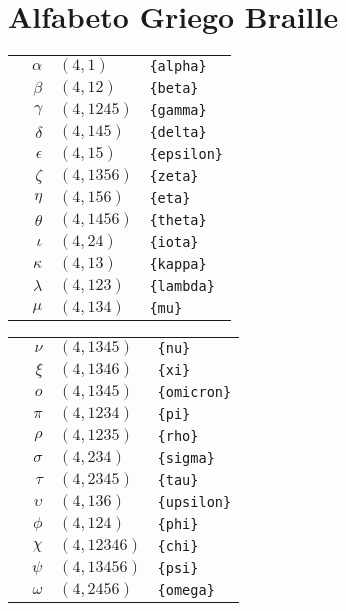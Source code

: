 \documentclass[draft]{article}
\newcommand{\myagtable}[1]{%
	\enskip\begin{tabular}[t]{l|r|l|l} 
		\hline #1 \hline
	\end{tabular}\enskip}
\begin{document}
\section{Alfabeto Griego Braille}

\begin{center}
	\myagtable{
		\braille{{alpha}}    & $\alpha$   & $(4,1)$     & \texttt{\{alpha\}}   \\
		\braille{{beta}}     & $\beta$    & $(4,12)$    & \texttt{\{beta\}}    \\
		\braille{{gamma}}    & $\gamma$   & $(4,1245)$  & \texttt{\{gamma\}}   \\
		\braille{{delta}}    & $\delta$   & $(4,145)$   & \texttt{\{delta\}}   \\
		\braille{{epsilon}}  & $\epsilon$ & $(4,15)$    & \texttt{\{epsilon\}} \\
		\braille{{zeta}}     & $\zeta$    & $(4,1356)$  & \texttt{\{zeta\}}    \\
		\braille{{eta}}      & $\eta$     & $(4,156)$   & \texttt{\{eta\}}     \\   
		\braille{{theta}}    & $\theta$   & $(4,1456)$  & \texttt{\{theta\}}   \\
		\braille{{iota}}     & $\iota$    & $(4,24)$    & \texttt{\{iota\}}    \\ 
		\braille{{kappa}}    & $\kappa$   & $(4,13)$    & \texttt{\{kappa\}}   \\
		\braille{{lambda}}   & $\lambda$  & $(4,123)$   & \texttt{\{lambda\}}  \\
		\braille{{mu}}       & $\mu$      & $(4,134)$   & \texttt{\{mu\}}      \\	
	}
	\myagtable{
		\braille{{nu}}       & $\nu$      & $(4,1345)$  & \texttt{\{nu\}}      \\
		\braille{{xi}}       & $\xi$      & $(4,1346)$  & \texttt{\{xi\}}      \\
		\braille{{omicron}}  & $o$        & $(4,1345)$  & \texttt{\{omicron\}} \\
		\braille{{pi}}       & $\pi$      & $(4,1234)$  & \texttt{\{pi\}}      \\
		\braille{{rho}}      & $\rho$     & $(4,1235)$  & \texttt{\{rho\}}     \\
		\braille{{sigma}}    & $\sigma$   & $(4,234)$   & \texttt{\{sigma\}}   \\
		\braille{{tau}}      & $\tau$     & $(4,2345)$  & \texttt{\{tau\}}     \\
		\braille{{upsilon}}  & $\upsilon$ & $(4,136)$   & \texttt{\{upsilon\}} \\
		\braille{{phi}}      & $\phi$     & $(4,124)$   & \texttt{\{phi\}}     \\
		\braille{{chi}}      & $\chi$     & $(4,12346)$ & \texttt{\{chi\}}     \\
		\braille{{psi}}      & $\psi$     & $(4,13456)$ & \texttt{\{psi\}}     \\
		\braille{{omega}}    & $\omega$   & $(4,2456)$  & \texttt{\{omega\}}   \\
	}
\end{center}
\end{document}
